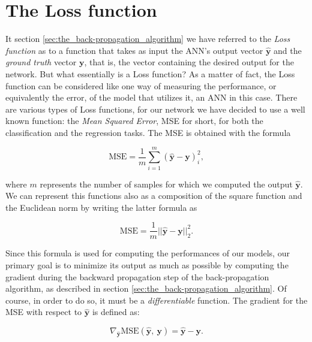 	\section{The Loss function} %
	\label{sec:the_loss_function}
		It section \ref{sec:the_back-propagation_algorithm} we have referred to the \textit{Loss function} as to a
		function that takes as input the ANN's output vector $\hat{\mathbf{y}}$ and the \textit{ground truth}
		vector $\mathbf{y}$, that is, the vector containing the desired output for the network. But what
        essentially is a Loss function? As a matter of fact, the Loss function can be considered like
		one way of measuring the performance, or equivalently the error, of the model that utilizes it, an ANN in
		this case. There are various types of Loss functions, for our network we have decided to use a well
		known function: the \textit{Mean Squared Error}, MSE for short, for both the classification and the
        regression tasks. The MSE is obtained with the formula

		\begin{equation*}
		\label{mse}
		    \text{MSE} = \frac{1}{m}\sum_{i = 1}^{m}\left ( \hat{\mathbf{y}} - \mathbf{y} \right )^{2}_{i},
		\end{equation*}

		where $m$ represents the number of samples for which we computed the output $\hat{\mathbf{y}}$. We can
        represent this functions also as a composition of the square function and the Euclidean norm by writing
        the latter formula as

        \begin{equation*}
            \text{MSE} = \frac{1}{m}|| \hat{\mathbf{y}} - \mathbf{y} ||^2_2 .
        \end{equation*}

        Since this formula is used for computing the performances of our models, our primary goal is to minimize its
		output as much as possible by computing the gradient during the backward propagation step of the
		back-propagation algorithm, as described in section \ref{sec:the_back-propagation_algorithm}. Of course,
        in order to do so, it must be a \textit{differentiable} function. The gradient for the MSE with respect to
		$\hat{\mathbf{y}}$ is defined as:

		\begin{equation*}
		     \nabla_{\hat{\mathbf{y}}}\text{MSE}\left(\hat{\mathbf{y}},\ \mathbf{y}\right) =
		     \hat{\mathbf{y}} - \mathbf{y}.
		\end{equation*}

